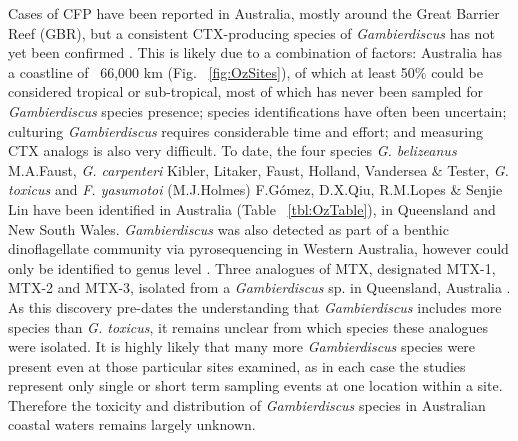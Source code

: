 \documentclass[12pt]{article}
\begin{document}
 
Cases of CFP have been reported in Australia, mostly around the Great Barrier Reef (GBR), but a consistent CTX-producing species of \emph{Gambierdiscus} has not yet been confirmed \citep{lewis2006ciguatera}. 
This is likely due to a combination of factors:
Australia has a coastline of ~66,000 km (Fig. ~\ref{fig:OzSites}), of which at least 50\% could be considered tropical or sub-tropical, most of which has never been sampled for \textit{Gambierdiscus} species presence; species identifications have often been uncertain; culturing \textit{Gambierdiscus} requires considerable time and effort; and measuring CTX analogs is also very difficult. 
To date,  the four species \emph{G. belizeanus} M.A.Faust, \emph{G. carpenteri} Kibler, Litaker, Faust, Holland, Vandersea \& Tester, \emph{G. toxicus} and \emph{F. yasumotoi} (M.J.Holmes) F.G\'omez, D.X.Qiu, R.M.Lopes \& Senjie Lin have been identified in Australia (Table ~\ref{tbl:OzTable}), in Queensland and New South Wales. 
\emph{Gambierdiscus} was also detected as part of a benthic dinoflagellate community via pyrosequencing in Western Australia, however could only be identified to genus level \citep{kohli2014cob}.
Three analogues of MTX, designated MTX-1, MTX-2 and MTX-3, isolated from a \emph{Gambierdiscus} sp. in Queensland, Australia \citep{holmes1994purification}. 
As this discovery pre-dates the understanding that \emph{Gambierdiscus} includes more species than \emph{G. toxicus}, it remains unclear from which species these analogues were isolated.  
It is highly likely that many more \emph{Gambierdiscus} species were present even at those particular sites examined, as in each case the studies represent only single or short term sampling events at one location within a site. 
Therefore the toxicity and distribution of \emph{Gambierdiscus} species in Australian coastal waters remains largely unknown. %
\end{document}
